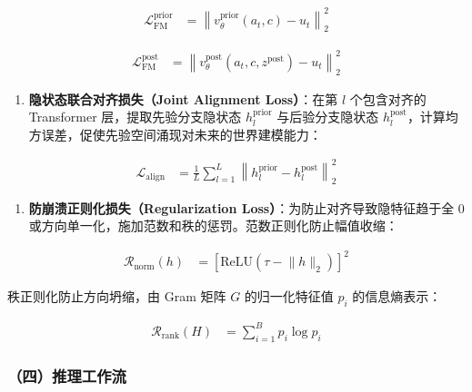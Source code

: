 \[
\begin{aligned}
\mathcal{L}_{\mathrm{FM}}^{\mathrm{prior}}
&=
\left\|
v_\theta^{\mathrm{prior}}(a_t,c) - u_t
\right\|_2^2
\end{aligned}
\]

\[
\begin{aligned}
\mathcal{L}_{\mathrm{FM}}^{\mathrm{post}}
&=
\left\|
v_\theta^{\mathrm{post}}(a_t,c,z^{\mathrm{post}}) - u_t
\right\|_2^2
\end{aligned}
\]

\begin{enumerate}
\def\labelenumi{\arabic{enumi}.}
\setcounter{enumi}{1}
\tightlist
\item
  \textbf{隐状态联合对齐损失（Joint Alignment Loss）}：在第 \(l\) 个包含对齐的 Transformer 层，提取先验分支隐状态 \(h_l^{\mathrm{prior}}\) 与后验分支隐状态 \(h_l^{\mathrm{post}}\)，计算均方误差，促使先验空间涌现对未来的世界建模能力：
\end{enumerate}

\[
\begin{aligned}
\mathcal{L}_{\mathrm{align}}
&=
\frac{1}{L}
\sum_{l=1}^{L}
\left\|
h_l^{\mathrm{prior}} - h_l^{\mathrm{post}}
\right\|_2^2
\end{aligned}
\]

\begin{enumerate}
\def\labelenumi{\arabic{enumi}.}
\setcounter{enumi}{2}
\tightlist
\item
  \textbf{防崩溃正则化损失（Regularization Loss）}：为防止对齐导致隐特征趋于全 0 或方向单一化，施加范数和秩的惩罚。范数正则化防止幅值收缩：
\end{enumerate}

\[
\begin{aligned}
\mathcal{R}_{\mathrm{norm}}(h)
&=
\left[
\mathrm{ReLU}(\tau - \lVert h\rVert_2)
\right]^2
\end{aligned}
\]

秩正则化防止方向坍缩，由 Gram 矩阵 \(G\) 的归一化特征值 \(p_i\) 的信息熵表示：

\[
\begin{aligned}
\mathcal{R}_{\mathrm{rank}}(H)
&=
\sum_{i=1}^{B} p_i \log p_i
\end{aligned}
\]

\hypertarget{ux56dbux63a8ux7406ux5de5ux4f5cux6d41-1}{%
\subsubsection{（四）推理工作流}\label{ux56dbux63a8ux7406ux5de5ux4f5cux6d41-1}}


